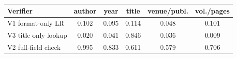 \begin{tabular}{@{}lccccc@{}}
\toprule
Verifier & author & year & title & venue/publ. & vol./pages \\
\midrule
V1 format-only LR & 0.102 & 0.095 & 0.114 & 0.048 & 0.101 \\
V3 title-only lookup & 0.020 & 0.041 & 0.846 & 0.036 & 0.009 \\
V2 full-field check & 0.995 & 0.833 & 0.611 & 0.579 & 0.706 \\
\bottomrule
\end{tabular}